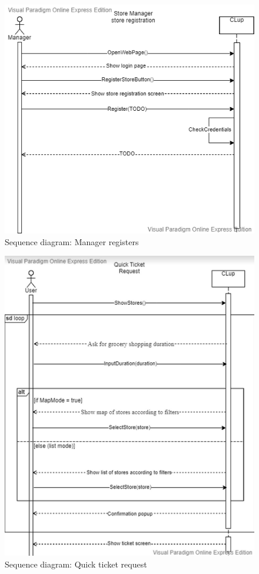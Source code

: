 \begin{figure}[H]
	\includegraphics[width=\linewidth]{../Diagrams/StoreRegistration.png}
	\caption{Sequence diagram: Manager registers}
	\label{fig:StoreReg}
\end{figure} 

\begin{figure}[H]
	\includegraphics[width=\linewidth]{../Diagrams/TicketRequest.png}
	\caption{Sequence diagram: Quick ticket request}
	\label{fig:TicketReq}
\end{figure} 

